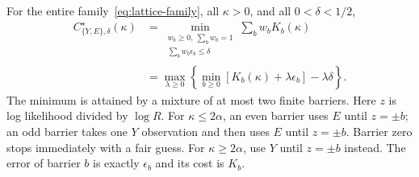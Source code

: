 \begin{theorem}
\label{thm:exact-price-frontier}
For the entire family~\eqref{eq:lattice-family}, all $\kappa>0$,
and all $0<\delta<1/2$,
\begin{align}
 C_{\{Y,E\},\delta}^\star(\kappa)
 &=\min_{\substack{w_b\geq0,\ \sum_bw_b=1\\
                    \sum_bw_b\epsilon_b\leq\delta}}
                       \sum_bw_bK_b(\kappa)\label{eq:exact-price-primal}\\
 &=\max_{\lambda\geq0}
       \left\{\min_{b\geq0}[K_b(\kappa)+\lambda\epsilon_b]
                   -\lambda\delta\right\}.\label{eq:exact-price-dual}
\end{align}
The minimum is attained by a mixture of at most two finite barriers.
Here $z$ is log likelihood divided by $\log R$.
For $\kappa\leq2\alpha$, an even barrier uses $E$ until $z=\pm b$;
an odd barrier takes one $Y$ observation and then uses $E$ until
$z=\pm b$. Barrier zero stops immediately with a fair guess.
For $\kappa\geq2\alpha$, use $Y$ until $z=\pm b$ instead.
The error of barrier $b$ is exactly $\epsilon_b$ and its cost is $K_b$.
\end{theorem}
